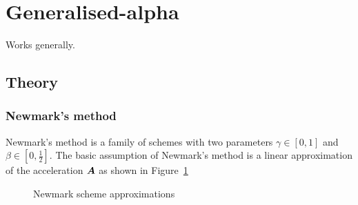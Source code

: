 \section{Generalised-alpha}

Works generally.

\subsection{Theory}

\subsubsection{Newmark's method}

Newmark's method \cite{strdyn:newmark59} is a family of schemes with two parameters $\gamma\in[0,1]$
and $\beta\in[0,\frac{1}{2}]$. The basic assumption of Newmark's method is a linear approximation of the acceleration $\boldsymbol{A}$ as shown in Figure~\ref{strdyn:fig:lindyn-newmark}
\begin{figure}[H]
\begin{center}
  \caption{Newmark scheme approximations}
  \label{strdyn:fig:lindyn-newmark}
\end{center}
\end{figure}
